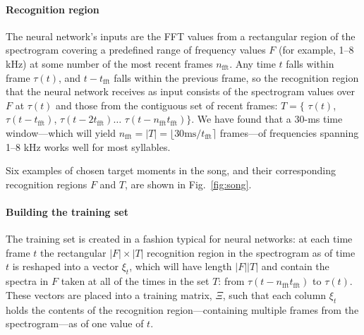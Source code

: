 \documentclass[10pt,letterpaper]{article}
\newcommand\fig[1]{Fig.~\ref{#1}}
\let\oldmarginpar\marginpar
\renewcommand{\marginpar}[1]{\oldmarginpar{\linespread{1}\scriptsize{#1}}}
\renewcommand{\subsubsection}[1]{\paragraph{#1}}
\begin{document}
\subsubsection{Recognition region}
\label{sec:recognitionregion}

The neural network's inputs are the FFT values from a rectangular
region of the spectrogram covering a predefined range of frequency
values $F$ (for example, 1--8 kHz) at some number of the most recent
frames $n_\textrm{fft}$.  Any time $t$ falls within frame
$\tau(t)$, and $t-t_\textrm{fft}$ falls within the previous frame, so the recognition region that the neural network receives as input
consists of the spectrogram values over $F$ at $\tau(t)$ and those
from the contiguous set of recent frames: $T = \{$ $\tau(t)$,
$\tau(t-t_\textrm{fft})$, $\tau(t-{2t_\textrm{fft}})\ldots$
$\tau(t-n_\textrm{fft}t_\textrm{fft})\}$.  We have found that a 30-ms
time window---which will yield $n_\textrm{fft} = |T|=\lfloor 30\textrm{
  ms}/t_\textrm{fft}\rceil$ frames---of frequencies spanning 1--8 kHz
works well for most syllables.

Six examples of chosen target moments in the song, and their
corresponding recognition regions $F$ and $T$, are shown in
\fig{fig:song}.




\subsubsection{Building the training set}

The training set is created in a fashion typical for neural networks:
at each time frame $t$ the rectangular $|F|\times |T|$ recognition
region in the spectrogram as of time $t$ is reshaped into a vector
$\xi_t$, which will have length $|F||T|$ and contain the spectra in
$F$ taken at all of the times in the set $T$: from
$\tau(t-n_\textrm{fft}t_\textrm{fft})$ to $\tau(t)$.  These vectors
are placed into a training matrix, $\Xi$, such that each column
$\xi_t$ holds the contents of the recognition region---containing
multiple frames from the spectrogram---as of one value of $t$.
\end{document}
